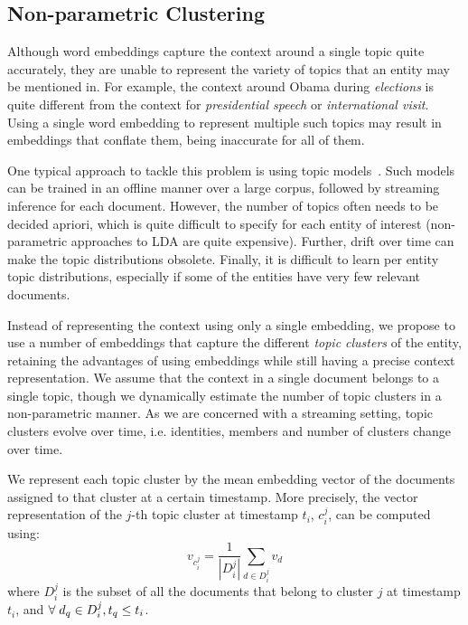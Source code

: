 \documentclass{article}
\begin{document}
\subsection{Non-parametric Clustering}
\label{non}

Although word embeddings capture the context around a single topic quite accurately, they are unable to represent the variety of topics that an entity may be mentioned in.
For example, the context around Obama during \emph{elections} is quite different from the context for \emph{presidential speech} or \emph{international visit}.
Using a single word embedding to represent multiple such topics may result in embeddings that conflate them, being inaccurate for all of them.

One typical approach to tackle this problem is using topic models~\cite{blei12}.
Such models can be trained in an offline manner over a large corpus, followed by streaming inference for each document.
However, the number of topics often needs to be decided apriori, which is quite difficult to specify for each entity of interest (non-parametric approaches to LDA are quite expensive).
Further, drift over time can make the topic distributions obsolete.
Finally, it is difficult to learn per entity topic distributions, especially if some of the entities have very few relevant documents.


Instead of representing the context using only a single embedding, we propose to use a number of embeddings that capture the different \emph{topic clusters} of the entity, retaining the advantages of using embeddings while still having a precise context representation.
We assume that the context in a single document belongs to a single topic, though we dynamically estimate the number of topic clusters in a non-parametric manner.
As we are concerned with a streaming setting, topic clusters evolve over time, i.e. identities, members and number of clusters change over time. 

We represent each topic cluster by the mean embedding vector of the documents assigned to that cluster at a certain timestamp.
More precisely, the vector representation of the $j$-th topic cluster at timestamp $t_i$, $c^j_i$, can be computed using: %
\begin{equation}
\label{nonparamclust}
v_{c^j_i} = \frac{1}{|D^j_i|} \sum_{d \in D^j_i}{v_d}
\end{equation}
where $D^j_i$ is the subset of all the documents that belong to cluster $j$ at timestamp $t_i$, and $\forall\hspace{1mm}d_q \in D^j_i, t_q \leq t_i$.
\end{document}
